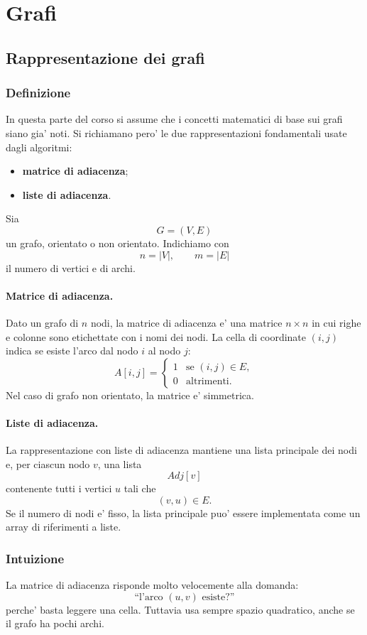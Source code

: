 \section{Grafi}

\subsection{Rappresentazione dei grafi}

\subsubsection{Definizione}
In questa parte del corso si assume che i concetti matematici di base sui grafi siano gia' noti. Si richiamano pero' le due rappresentazioni fondamentali usate dagli algoritmi:
\begin{itemize}
	\item \textbf{matrice di adiacenza};
	\item \textbf{liste di adiacenza}.
\end{itemize}

Sia
\[
G=(V,E)
\]
un grafo, orientato o non orientato. Indichiamo con
\[
n=|V|,\qquad m=|E|
\]
il numero di vertici e di archi.

\paragraph{Matrice di adiacenza.}
Dato un grafo di $n$ nodi, la matrice di adiacenza e' una matrice $n\times n$ in cui righe e colonne sono etichettate con i nomi dei nodi. La cella di coordinate $(i,j)$ indica se esiste l'arco dal nodo $i$ al nodo $j$:
\[
A[i,j]=
\begin{cases}
1 & \text{se } (i,j)\in E,\\
0 & \text{altrimenti.}
\end{cases}
\]
Nel caso di grafo non orientato, la matrice e' simmetrica.

\paragraph{Liste di adiacenza.}
La rappresentazione con liste di adiacenza mantiene una lista principale dei nodi e, per ciascun nodo $v$, una lista
\[
Adj[v]
\]
contenente tutti i vertici $u$ tali che
\[
(v,u)\in E.
\]
Se il numero di nodi e' fisso, la lista principale puo' essere implementata come un array di riferimenti a liste.

\subsubsection{Intuizione}
La matrice di adiacenza risponde molto velocemente alla domanda:
\[
\text{``l'arco }(u,v)\text{ esiste?''}
\]
perche' basta leggere una cella. Tuttavia usa sempre spazio quadratico, anche se il grafo ha pochi archi.

